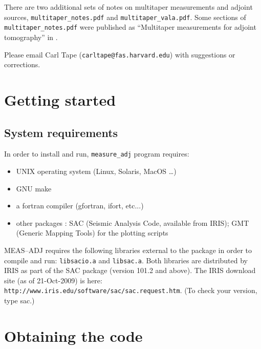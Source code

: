 \documentclass[11pt,titlepage,fleqn]{article}
\begin{document}
There are two additional sets of notes on multitaper measurements and adjoint sources, \verb+multitaper_notes.pdf+ and \verb+multitaper_vala.pdf+. Some sections of \verb+multitaper_notes.pdf+ were published as ``Multitaper measurements for adjoint tomography'' in \citet[][Appendix~C]{Tape2009phd}.

Please email Carl Tape (\verb+carltape@fas.harvard.edu+) with suggestions or corrections.


\section{Getting started}


\subsection{System requirements}

In order to install and run, \verb+measure_adj+ program requires:
%
\begin{itemize}
\item UNIX operating system (Linux, Solaris, MacOS \ldots)
\item GNU make
\item a fortran compiler (gfortran, ifort, etc...) 
\item other packages : SAC (Seismic Analysis Code, available from IRIS); GMT (Generic Mapping Tools) for the plotting scripts
\end{itemize}

MEAS--ADJ requires the following libraries external to the package in order to compile and run: {\tt libsacio.a} and {\tt libsac.a}. Both libraries are distributed by IRIS as part of the SAC package (version 101.2 and above). The IRIS download site (as of 21-Oct-2009) is here: \verb+http://www.iris.edu/software/sac/sac.request.htm+. (To check your version, type sac.)


\section{Obtaining the code}

\end{document}

